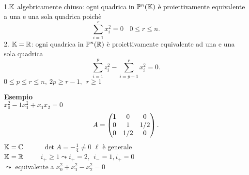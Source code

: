 \documentclass[12px]{article}
\begin{document}
	 \begin{teo}
		1.$\mathbb{K}$ algebricamente chiuso: ogni quadrica in $\mathbb{P}^n(\mathbb{K})$ è proiettivamente equivalente a una e una sola quadrica poichè
		\[
		 \sum^r_{i=1}x_i^2=0 \ \ \ \ 0\leq r\leq n
		.\] 
		2. $\mathbb{K}=\mathbb{R}$: ogni quadrica in $\mathbb{P}^n(\mathbb{R})$ è proiettivamente equivalente ad una e una sola quadrica
		\[
		\sum^p_{i=1}z_i^2 - \sum^r_{i=p+1}x_i^2=0
		.\] 
		$0\leq p \leq r\leq n, \ 2p\geq r-1, \ \ r\geq 1$
	\end{teo}
	\textbf{Esempio}\\
	$x_0^2 -1 x_1^2 + x_1x_2=0$\\
	 \[
		 A=\begin{pmatrix}1&0&0\\0&1&1/2\\0&1/2&0\end{pmatrix}
	.\] 
	$\mathbb{K}=\mathbb{C}$ \ \ \ \ \ $\det A = -\frac 1 4\neq 0$ $\ell$ è generale\\
	$\mathbb{K} = \mathbb{R}$\ \ \ \ \  $i_+\geq 1 \leadsto i_+=2,\ \ i_-=1,i_+=0$\\
	 $\leadsto $ equivalente a $x_0^2+x_1^2-x_2^2=0$
\end{document}
